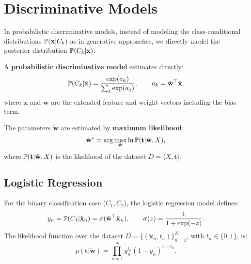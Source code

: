 \documentclass[10pt, letterpaper]{report}
\begin{document}

\section{Discriminative Models}
In probabilistic discriminative models, instead of modeling the class-conditional distributions ${\mathbb P}(\mathbf x|C_k)$ as in generative approaches, we directly model the posterior distribution ${\mathbb P}(C_k|\mathbf x)$.

\begin{definition}
	A \textbf{probabilistic discriminative model} estimates directly:
	\begin{equation}
		{\mathbb P}(C_k|\tilde{\mathbf x}) = \frac{\exp(a_k)}{\sum_j \exp(a_j)}, \qquad
		a_k = \tilde{\mathbf w}^\top \tilde{\mathbf x},
	\end{equation}
	where $\tilde{\mathbf x}$ and $\tilde{\mathbf w}$ are the extended feature and weight vectors including the bias term.
\end{definition}

The parameters $\tilde{\mathbf w}$ are estimated by \textbf{maximum likelihood}:
\begin{equation}
	\tilde{\mathbf w}^* = \arg\max_{\tilde{\mathbf w}} \ln {\mathbb P}(\mathbf t|\tilde{\mathbf w}, X),
\end{equation}
where ${\mathbb P}(\mathbf t|\tilde{\mathbf w}, X)$ is the likelihood of the dataset $D=\langle X,\mathbf t\rangle$.

\subsection{Logistic Regression}
For the binary classification case ($C_1,C_2$), the logistic regression model defines:
\begin{equation}
	y_n = {\mathbb P}(C_1|\tilde{\mathbf x}_n) = \sigma(\tilde{\mathbf w}^\top \tilde{\mathbf x}_n), \qquad \sigma(z) = \frac{1}{1+\exp(-z)}.
\end{equation}
The likelihood function over the dataset $D=\{(\tilde{\mathbf x}_n,t_n)\}_{n=1}^N$, with $t_n\in\{0,1\}$, is:
\begin{equation}
	p(\mathbf t|\tilde{\mathbf w}) = \prod_{n=1}^N y_n^{t_n}(1-y_n)^{1-t_n}.
\end{equation}
\end{document}
